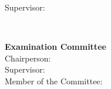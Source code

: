 \begin{titlepage}
\begin{center}
\begin{minipage}[t]{.24\textwidth}
  \center
  \begin{flushright}
    {\large Supervisor:~~}
  \end{flushright}
\end{minipage}%
\begin{minipage}[t]{.76\textwidth}
  \center
  \begin{flushleft}
    {\Supervisors}
  \end{flushleft}
\end{minipage}\\
%
\if{}
  \vspace*{\finalAdvisorsSpacing}
\else
  \vspace*{\draftAdvisorsSpacing}
\fi
%
\if{}
%
\begin{minipage}[t]{1\textwidth}
  \center
  {\Large \textbf{Examination Committee}}\\[.25cm]
  {\large Chairperson: \Chairperson}\\
  {\large Supervisor: \Advisor}\\
  {\large Member of the Committee: \CommitteeMembers}
\end{minipage}\\[1.0cm]
%
\fi
%

\if{}
 \vspace*{\dateSpacing}
\fi

{\Large \textbf{\Month\:\Year}}\\
\end{center}
\thispagestyle{empty}
\end{titlepage}
